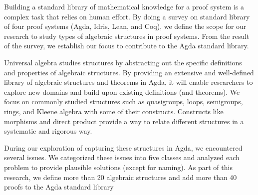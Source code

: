 Building a standard library of mathematical knowledge for a proof system is a
complex task that relies on human effort. By doing a survey on standard library
of four proof systems (Agda, Idris, Lean, and Coq), we define the scope for our
research to study types of algebraic structures in proof systems. From the
result of the survey, we establish our focus to contribute to the Agda standard
library. 

Universal algebra studies structures by abstracting out the specific definitions
and properties of algebraic structures. By providing an extensive and
well-defined library of algebraic structures and theorems in Agda, it will
enable researchers to explore new domains and build upon existing definitions
(and theorems). We focus on commonly studied structures such as quasigroups,
loops, semigroups, rings, and Kleene algebra with some of their constructs.
Constructs like morphisms and direct product provide a way to relate different
structures in a systematic and rigorous way. 

During our exploration of capturing these structures in Agda, we encountered
several issues. We categorized these issues into five classes and analyzed each
problem to provide plausible solutions (except for naming). As part
of this research, we define more than 20 algebraic structures and add more than
40 proofs to the Agda standard library